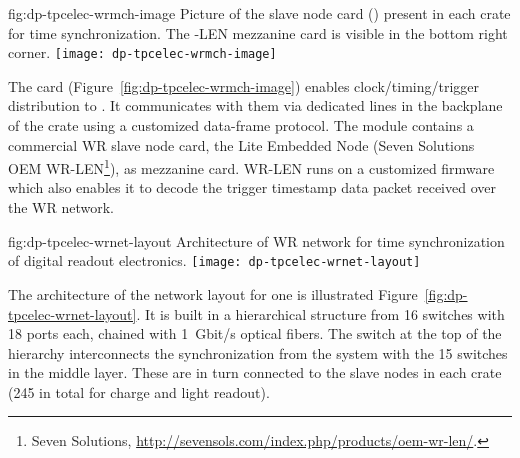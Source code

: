 \begin{dunefigure}{fig:dp-tpcelec-wrmch-image}
{Picture of the  slave node card () present in each  crate for time synchronization. The -LEN mezzanine card is visible in the bottom right corner.}
\texttt{[image: dp-tpcelec-wrmch-image]}
\end{dunefigure}

The  card (Figure~\ref{fig:dp-tpcelec-wrmch-image}) enables clock/timing/trigger distribution to . It communicates with them via dedicated lines in the backplane of the  crate using a customized data-frame protocol. The module contains a commercial WR slave node card, the  Lite Embedded Node (Seven Solutions OEM WR-LEN\footnote{Seven Solutions\texttrademark{}, \url{http://sevensols.com/index.php/products/oem-wr-len/}.}), as mezzanine card. WR-LEN runs on a customized firmware which also enables it to decode the trigger timestamp data packet received over the WR network.

\begin{dunefigure}{fig:dp-tpcelec-wrnet-layout}
{Architecture of WR network for time synchronization of digital readout electronics.}
\texttt{[image: dp-tpcelec-wrnet-layout]}
\end{dunefigure}

The architecture of the  network layout for one  is illustrated Figure~\ref{fig:dp-tpcelec-wrnet-layout}. It is built in a hierarchical structure from \num{16}  switches with \num{18} ports each,  chained with \SI{1}{Gbit/s} optical fibers. The switch at the top of the hierarchy interconnects the synchronization  from the  system with the \num{15} switches in the middle layer. These are in turn connected to the  slave nodes in each  crate (\num{245} in total for charge and light readout). 


